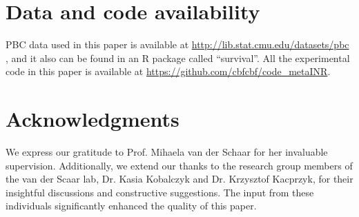 \documentclass{article}
\begin{document}



\section*{Data and code availability}
PBC data used in this paper is available at \url{http://lib.stat.cmu.edu/datasets/pbc} , and it also can be found in an R package called ``survival''.
All the experimental code in this paper is available at \url{https://github.com/cbfcbf/code\_metaINR}.

\section*{Acknowledgments}
We express our gratitude to Prof. Mihaela van der Schaar for her invaluable supervision. 
Additionally, we extend our thanks to the research group members of the van der Scaar lab, Dr. Kasia Kobalczyk and Dr. Krzysztof Kacprzyk, for their insightful discussions and constructive suggestions. 
The input from these individuals significantly enhanced the quality of this paper.





\end{document}
